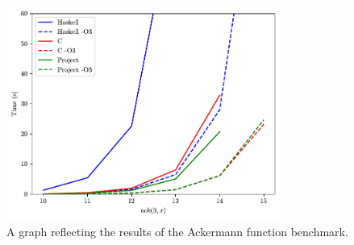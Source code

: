 
\begin{figure}
    \centering
    \includegraphics[width=0.8\textwidth]{Graphics/ackermann-benchmark.pdf}
    \caption{A graph reflecting the results of the Ackermann function benchmark.}
    \label{fig:ackermann-benchmark}
\end{figure}

